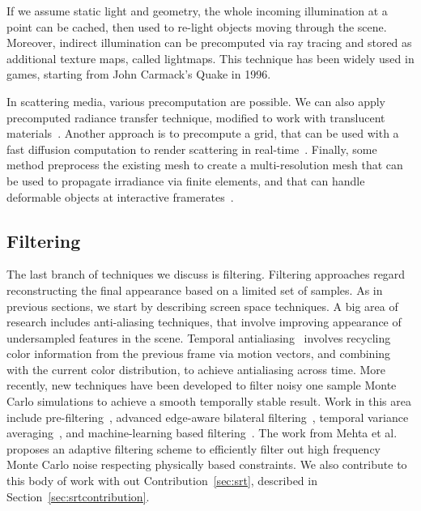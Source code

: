If we assume static light and geometry, the whole incoming illumination at a point can be cached, then used to re-light objects moving through the scene. Moreover, indirect illumination can be precomputed via ray tracing and stored as additional texture maps, called lightmaps. This technique has been widely used in games, starting from John Carmack's Quake in 1996.    

In scattering media, various precomputation are possible. We can also apply precomputed radiance transfer technique, modified to work with translucent materials~\cite{Sloan2003}. Another approach is to precompute a grid, that can be used with a fast diffusion computation to render scattering in real-time~\cite{Wang2008a}. Finally, some method preprocess the existing mesh to create a multi-resolution mesh that can be used to propagate irradiance via finite elements, and that can handle deformable objects at interactive framerates~\cite{Mertens2003, Li2013}. 

\subsection{Filtering}

The last branch of techniques we discuss is filtering. Filtering approaches regard reconstructing the final appearance based on a limited set of samples. As in previous sections, we start by describing screen space techniques. A big area of research includes anti-aliasing techniques, that involve improving appearance of undersampled features in the scene. Temporal antialiasing~\cite{Karis2014,Patney2016} involves recycling color information from the previous frame via motion vectors, and combining with the current color distribution, to achieve antialiasing across time. More recently, new techniques have been developed to filter noisy one sample Monte Carlo simulations to achieve a smooth temporally stable result. Work in this area include pre-filtering~\cite{Crassin2015}, advanced edge-aware bilateral filtering~\cite{Mara2017}, temporal variance averaging~\cite{Schied17}, and machine-learning based filtering~\cite{Chaitanya2017}. The work from Mehta et al.~\cite{Mehta2013} proposes an adaptive filtering scheme to efficiently filter out high frequency Monte Carlo noise respecting physically based constraints. We also contribute to this body of work with out Contribution~\ref{sec:srt}, described in Section~\ref{sec:srtcontribution}.

